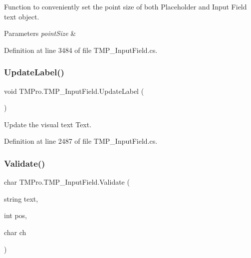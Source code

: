 Function to conveniently set the point size of both Placeholder and Input Field text object. 


\begin{DoxyParams}{Parameters}
{\em point\+Size} & \\
\hline
\end{DoxyParams}


Definition at line 3484 of file T\+M\+P\+\_\+\+Input\+Field.\+cs.

\mbox{\label{class_t_m_pro_1_1_t_m_p___input_field_a1ac4c595e5f686b371e27745b0a2c99b}} 
\subsubsection{\texorpdfstring{UpdateLabel()}{UpdateLabel()}}
{\footnotesize\ttfamily void T\+M\+Pro.\+T\+M\+P\+\_\+\+Input\+Field.\+Update\+Label (\begin{DoxyParamCaption}{ }\end{DoxyParamCaption})\hspace{0.3cm}{\ttfamily [protected]}}



Update the visual text Text. 



Definition at line 2487 of file T\+M\+P\+\_\+\+Input\+Field.\+cs.

\mbox{\label{class_t_m_pro_1_1_t_m_p___input_field_afd6552ded1ac4de1c4efd868bdc66a33}} 
\subsubsection{\texorpdfstring{Validate()}{Validate()}}
{\footnotesize\ttfamily char T\+M\+Pro.\+T\+M\+P\+\_\+\+Input\+Field.\+Validate (\begin{DoxyParamCaption}\item[{string}]{text,  }\item[{int}]{pos,  }\item[{char}]{ch }\end{DoxyParamCaption})\hspace{0.3cm}{\ttfamily [protected]}}



